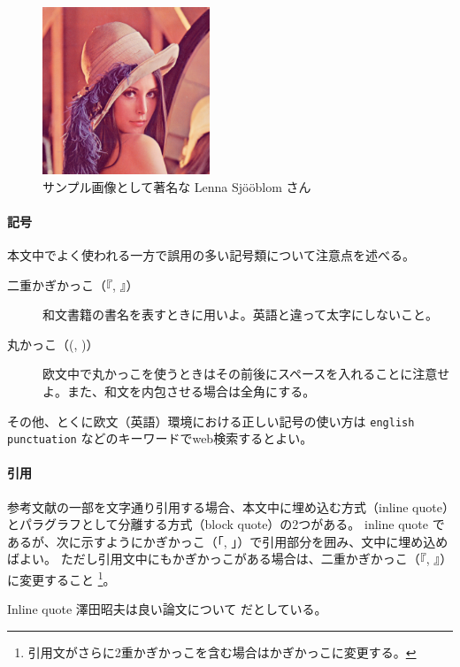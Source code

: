 			\begin{figure}[tb]
				\centering
				\includegraphics[width=5cm]{figure/Lenna.png}
				\caption{サンプル画像として著名な Lenna Sjööblom さん}
				\label{fig:sample}
			\end{figure}

		\paragraph{記号}
			\label{par:symbol}

			本文中でよく使われる一方で誤用の多い記号類について注意点を述べる。

			\begin{description}
				\item[二重かぎかっこ（『, 』）] 和文書籍の書名を表すときに用いよ。英語と違って太字にしないこと。
				\item[丸かっこ（(, )）] 欧文中で丸かっこを使うときはその前後にスペースを入れることに注意せよ。また、和文を内包させる場合は全角にする。
			\end{description}

			\noindent
			その他、とくに欧文（英語）環境における正しい記号の使い方は \texttt{english punctuation} などのキーワードでweb検索するとよい。

		\paragraph{引用}
			\label{par:cite}

			参考文献の一部を文字通り引用する場合、本文中に埋め込む方式（inline quote）とパラグラフとして分離する方式（block quote）の2つがある。
			inline quote であるが、次に示すようにかぎかっこ（「, 」）で引用部分を囲み、文中に埋め込めばよい。
			ただし引用文中にもかぎかっこがある場合は、二重かぎかっこ（『, 』）に変更すること
			\footnote{引用文がさらに2重かぎかっこを含む場合はかぎかっこに変更する。}。

			\begin{itembox}[l]{Inline quote}
				澤田昭夫は良い論文について だとしている。
			\end{itembox}


